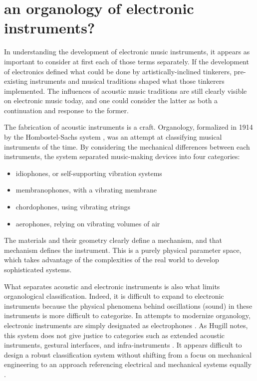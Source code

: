 \section{an organology of electronic instruments?}  

In understanding the development of electronic music instruments, it appears as important to consider at first each of those terms separately. If the development of electronics defined what could be done by artistically-inclined tinkerers, pre-existing instruments and musical traditions shaped what those tinkerers implemented. The influences of acoustic music traditions are still clearly visible on electronic music today, and one could consider the latter as both a continuation and response to the former. 

The fabrication of acoustic instruments is a craft. Organology, formalized in 1914 by the Hombostel-Sachs system \cite{von1961}, was an attempt at classifying musical instruments of the time. By considering the mechanical differences between each instruments, the system separated music-making devices into four categories: 

\begin{itemize}
	\item idiophones, or self-supporting vibration systems
	\item membranophones, with a vibrating membrane
	\item chordophones, using vibrating strings
	\item aerophones, relying on vibrating volumes of air
\end{itemize}

The materials and their geometry clearly define a mechanism, and that mechanism defines the instrument. This is a purely physical parameter space, which takes advantage of the complexities of the real world to develop sophisticated systems. 

What separates acoustic and electronic instruments is also what limits organological classification. Indeed, it is difficult to expand to electronic instruments because the physical phenomena behind oscillations (sound) in these instruments is more difficult to categorize. In attempts to modernize organology, electronic instruments are simply designated as electrophones \cite{hugill2012}. As Hugill notes, this system does not give justice to categories such as extended acoustic instruments, gestural interfaces, and infra-instruments \cite{bowers2005}. It appears difficult to design a robust classification system without shifting from a focus on mechanical engineering to an approach referencing electrical and mechanical systems equally \cite{haslett2005}. 

